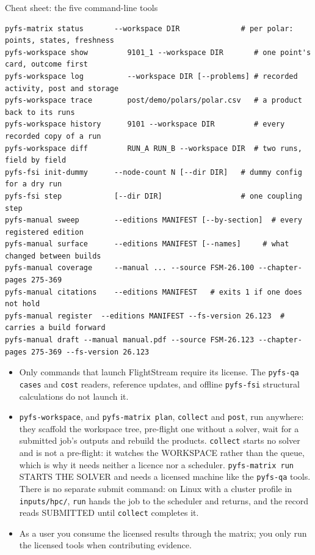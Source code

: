 \documentclass[aspectratio=169,10pt]{beamer}
\newcommand{\code}[1]{\texttt{\small #1}}
\begin{document}
\begin{frame}{Cheat sheet: the five command-line tools}
\begin{lstlisting}[style=txt]
pyfs-matrix status       --workspace DIR              # per polar: points, states, freshness
pyfs-workspace show         9101_1 --workspace DIR       # one point's card, outcome first
pyfs-workspace log          --workspace DIR [--problems] # recorded activity, post and storage
pyfs-workspace trace        post/demo/polars/polar.csv   # a product back to its runs
pyfs-workspace history      9101 --workspace DIR         # every recorded copy of a run
pyfs-workspace diff         RUN_A RUN_B --workspace DIR  # two runs, field by field
pyfs-fsi init-dummy      --node-count N [--dir DIR]   # dummy config for a dry run
pyfs-fsi step            [--dir DIR]                  # one coupling step
pyfs-manual sweep        --editions MANIFEST [--by-section]  # every registered edition
pyfs-manual surface      --editions MANIFEST [--names]     # what changed between builds
pyfs-manual coverage     --manual ... --source FSM-26.100 --chapter-pages 275-369
pyfs-manual citations    --editions MANIFEST   # exits 1 if one does not hold
pyfs-manual register  --editions MANIFEST --fs-version 26.123  # carries a build forward
pyfs-manual draft --manual manual.pdf --source FSM-26.123 --chapter-pages 275-369 --fs-version 26.123
\end{lstlisting}
  \begin{itemize}
    \item Only commands that launch FlightStream require its license. The \code{pyfs-qa cases} and \code{cost} readers, reference updates, and offline \code{pyfs-fsi} structural calculations do not launch it.
    \item \code{pyfs-workspace}, and \code{pyfs-matrix plan}, \code{collect} and \code{post}, run anywhere: they scaffold the workspace tree, pre-flight one without a solver, wait for a submitted job's outputs and rebuild the products. \code{collect} starts no solver and is not a pre-flight: it watches the WORKSPACE rather than the queue, which is why it needs neither a licence nor a scheduler. \code{pyfs-matrix run} STARTS THE SOLVER and needs a licensed machine like the \code{pyfs-qa} tools. There is no separate submit command: on Linux with a cluster profile in \code{inputs/hpc/}, \code{run} hands the job to the scheduler and returns, and the record reads SUBMITTED until \code{collect} completes it.
    \item As a user you consume the licensed results through the matrix; you only run the licensed tools when contributing evidence.
  \end{itemize}
\end{frame}
\end{document}
